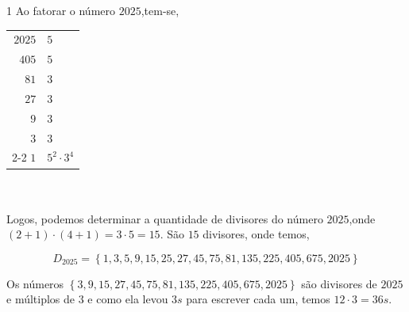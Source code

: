 \begin{solucoes}{1}
    \solucao
    Ao fatorar o número $2025$,tem-se, \\
    
    \begin{tabular}{r|l}
        $2025$ & $5$ \\
         $405$ & $5$ \\
         $81$ & $3$ \\
         $27$ & $3$ \\ 
         $9$ & $3$ \\
         $3$ & $3$\\ \cline{2-2}
         $1$ & $5^2\cdot 3^4$
    \end{tabular}
\\\\
Logos, podemos determinar a quantidade de divisores do número $2025$,onde $(2+1)\cdot (4+1)=3\cdot5=15$. São $15$ divisores, onde temos,

\begin{equation*}
    D_{2025}= \left\{ 1,3,5,9,15,25,27,45,75,81,135,225,405,675,2025\right\}
\end{equation*}

Os números $ \left\{3,9,15,27,45,75,81,135, 225, 405,675,2025\right\}$ são divisores de $2025$ e múltiplos de $3$ e como ela levou $3s$ para escrever cada um, temos $12\cdot 3=36s$.     
\end{solucoes}


